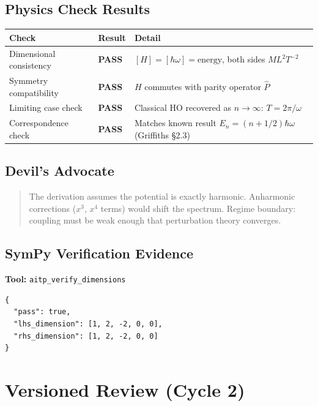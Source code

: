 \documentclass[11pt,a4paper]{article}
\newcommand{\statuspass}{\textcolor{passgreen}{\textbf{PASS}}}
\begin{document}
\subsection{Physics Check Results}

\begin{longtable}{>{\raggedright}p{4cm} p{2cm} p{6cm}}
\toprule
\textbf{Check} & \textbf{Result} & \textbf{Detail} \\
\midrule
\endhead
Dimensional consistency & \statuspass & $[H] = [\hbar\omega] = \text{energy}$, both sides $ML^2T^{-2}$ \\
Symmetry compatibility & \statuspass & $H$ commutes with parity operator $\hat{P}$ \\
Limiting case check  & \statuspass & Classical HO recovered as $n \to \infty$: $T = 2\pi/\omega$ \\
Correspondence check & \statuspass & Matches known result $E_n = (n+1/2)\hbar\omega$ (Griffiths \S2.3) \\
\bottomrule
\end{longtable}

\subsection{Devil's Advocate}

\begin{quote}
The derivation assumes the potential is exactly harmonic. Anharmonic
corrections ($x^3$, $x^4$ terms) would shift the spectrum. Regime boundary:
coupling must be weak enough that perturbation theory converges.
\end{quote}

\subsection{SymPy Verification Evidence}

\textbf{Tool:} \texttt{aitp\_verify\_dimensions}

\begin{verbatim}
{
  "pass": true,
  "lhs_dimension": [1, 2, -2, 0, 0],
  "rhs_dimension": [1, 2, -2, 0, 0]
}
\end{verbatim}


\section{Versioned Review (Cycle 2)}
\end{document}
